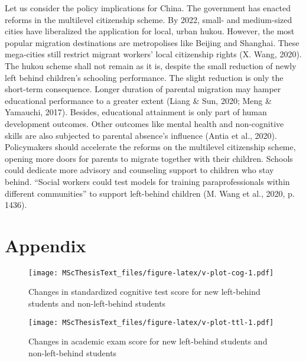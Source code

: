 \documentclass[
  man,floatsintext]{apa7}
\begin{document}
Let us consider the policy implications for China. The government has enacted reforms in the multilevel citizenship scheme. By 2022, small- and medium-sized cities have liberalized the application for local, urban hukou. However, the most popular migration destinations are metropolises like Beijing and Shanghai. These mega-cities still restrict migrant workers' local citizenship rights (X. Wang, 2020). The hukou scheme shall not remain as it is, despite the small reduction of newly left behind children's schooling performance. The slight reduction is only the short-term consequence. Longer duration of parental migration may hamper educational performance to a greater extent (Liang \& Sun, 2020; Meng \& Yamauchi, 2017). Besides, educational attainment is only part of human development outcomes. Other outcomes like mental health and non-cognitive skills are also subjected to parental absence's influence (Antia et al., 2020). Policymakers should accelerate the reforms on the multilevel citizenship scheme, opening more doors for parents to migrate together with their children. Schools could dedicate more advisory and counseling support to children who stay behind. ``Social workers could test models for training paraprofessionals within different communities'' to support left-behind children (M. Wang et al., 2020, p. 1436).

\newpage

\hypertarget{appendix}{%
\section{Appendix}\label{appendix}}









\begin{figure}
\centering
\texttt{[image: MScThesisText\_files/figure-latex/v-plot-cog-1.pdf]}
\caption{\label{fig:v-plot-cog}Changes in standardized cognitive test score for new left-behind students and non-left-behind students}
\end{figure}

\newpage

\begin{figure}
\centering
\texttt{[image: MScThesisText\_files/figure-latex/v-plot-ttl-1.pdf]}
\caption{\label{fig:v-plot-ttl}Changes in academic exam score for new left-behind students and non-left-behind students}
\end{figure}
\end{document}
